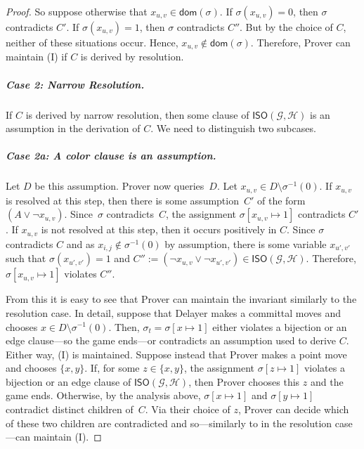 \documentclass[a4paper,english, thm-restate]{lipics-v2021}
\newcommand{\graphG}{\mathcal{G}}
\newcommand{\graphH}{\mathcal{H}}
\newcommand{\dom}{\mathsf{dom}}
\newcommand{\ISO}{\mathsf{ISO}(\graphG, \graphH)}
\begin{document}
\begin{proof}
So suppose otherwise that $x_{u,v} \in \dom(\sigma)$. If $\sigma(x_{u,v}) = 0$, then $\sigma$ contradicts $C'$.
If $\sigma(x_{u,v}) = 1$, then $\sigma$ contradicts $C''$. But by the choice of $C$, neither of these situations occur.
Hence, $x_{u,v} \not \in \dom(\sigma)$. Therefore, Prover can maintain (I) if $C$ is derived by resolution.

\subparagraph{Case 2: Narrow Resolution.} If $C$ is derived by narrow resolution, then some clause of $\ISO$ is an assumption in the derivation of $C$. We need to distinguish two subcases.

\subparagraph{Case 2a: A color clause is an assumption.} Let $D$ be this assumption. Prover now queries~$D$. Let $x_{u,v} \in D \setminus \sigma^{-1}(0) $. If $x_{u,v}$ is resolved at this step, then there is some assumption~$C'$ of the form $(A \vee \neg x_{u,v})$. Since~$\sigma$ contradicts~$C$, the assignment $\sigma[x_{u,v} \mapsto 1]$ contradicts $C'$. If $x_{u,v}$ is not resolved at this step, then it occurs positively in $C$. Since $\sigma$ contradicts $C$ and as $x_{i,j} \not \in \sigma^{-1}(0)$ by assumption, there is some variable $x_{u', v'}$ such that $\sigma(x_{u', v'}) = 1$ and $C'' :=(\neg x_{u,v} \vee \neg x_{u', v'}) \in \ISO$. Therefore, $\sigma[x_{u,v} \mapsto 1]$ violates $C''$. 

From this it is easy to see that Prover can maintain the invariant similarly to the resolution case. In detail, suppose that Delayer makes a committal moves and chooses $x \in D \setminus \sigma^{-1}(0)$. Then,
$\sigma_{t} = \sigma[x \mapsto 1]$ either violates a bijection or an edge clause---so the game ends---or contradicts an assumption used to derive $C$. Either way, (I) is maintained. Suppose instead that Prover makes a point move and chooses $\{x,y\}$.
If, for some $z \in \{x,y\}$, the assignment $\sigma[z\mapsto1]$ violates a bijection or an edge clause of $\ISO$, then Prover chooses this $z$ and the game ends.
Otherwise, by the analysis above, $\sigma[x\mapsto1]$ and $\sigma[y\mapsto1]$ contradict distinct children of~$C$. Via their choice of $z$, Prover can decide which of these two children are contradicted and so---similarly to in the resolution case---can maintain (I). 


\end{proof}
\end{document}

